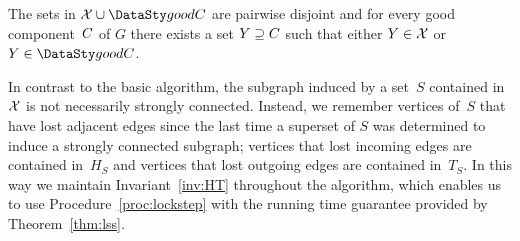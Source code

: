 \vspace{-0.5mm}
\begin{invariant}\label{inv:gccontained}
The sets in $\mathcal{\ec} \cup \goodC$ are pairwise disjoint and for every good 
component~$C$ of $G$ there exists a set $Y \supseteq C$
such that either $Y \in \mathcal{X}$ or $Y \in \goodC$.
\end{invariant}

\vspace{-0.5mm}
\smallskip{}
In contrast to the basic algorithm, the subgraph induced by a set~$S$ contained 
in~$\mathcal{X}$ is not necessarily strongly connected. Instead, we remember
vertices of~$S$ that have lost adjacent edges since the last time a superset
of $S$ was determined to induce a strongly connected subgraph; vertices that lost 
incoming edges are contained in~$H_S$ and vertices that lost 
outgoing edges are contained in~$T_S$. 
In this way we maintain Invariant~\ref{inv:HT} throughout the algorithm,
which enables us to use Procedure~\ref{proc:lockstep} with the running time 
guarantee provided by Theorem~\ref{thm:lss}.

